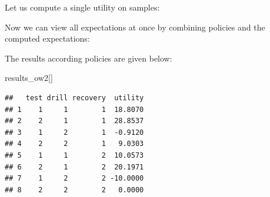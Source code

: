 \documentclass[
]{article}
\newenvironment{Shaded}{\begin{snugshade}}{\end{snugshade}}
\newcommand{\AttributeTok}[1]{\textcolor[rgb]{0.77,0.63,0.00}{#1}}
\newcommand{\ControlFlowTok}[1]{\textcolor[rgb]{0.13,0.29,0.53}{\textbf{#1}}}
\newcommand{\DecValTok}[1]{\textcolor[rgb]{0.00,0.00,0.81}{#1}}
\newcommand{\FunctionTok}[1]{\textcolor[rgb]{0.00,0.00,0.00}{#1}}
\newcommand{\NormalTok}[1]{#1}
\newcommand{\OtherTok}[1]{\textcolor[rgb]{0.56,0.35,0.01}{#1}}
\newcommand{\SpecialCharTok}[1]{\textcolor[rgb]{0.00,0.00,0.00}{#1}}
\newcommand{\StringTok}[1]{\textcolor[rgb]{0.31,0.60,0.02}{#1}}
\begin{document}
Let us compute a single utility on samples:

\begin{Shaded}
\end{Shaded}

Now we can view all expectations at once by combining policies and the computed expectations:

\begin{Shaded}
\end{Shaded}

The results according policies are given below:

\begin{Shaded}
\begin{Highlighting}[]
\NormalTok{results\_ow2[]}
\end{Highlighting}
\end{Shaded}

\begin{verbatim}
##   test drill recovery  utility
## 1    1     1        1  18.8070
## 2    2     1        1  28.8537
## 3    1     2        1  -0.9120
## 4    2     2        1   9.0303
## 5    1     1        2  10.0573
## 6    2     1        2  20.1971
## 7    1     2        2 -10.0000
## 8    2     2        2   0.0000
\end{verbatim}
\end{document}
